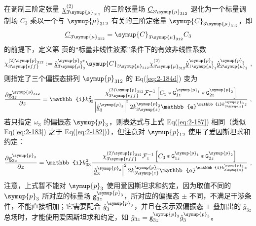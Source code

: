 在调制三阶定张量 $\underline{\chi}^{(2)}_{3{\symup{\mu}}_{312}}$ 的三阶张量场 $\underline{C}_{3{\symup{\mu}}_{312}}$ 退化为一个标量调制场 $C_{3}$ 乘以一个与 ${\symup{\mu}}_{312}$ 有关的三阶定张量 $\symup{C}_{3{\symup{\mu}}_{312}}$，即
\begin{equation} \label{eq:2-185}
	\abovedisplayskip=13pt
	\belowdisplayskip=13pt
	\underline{C}_{3{\symup{\mu}}_{312}} = \symup{C}_{3{\symup{\mu}}_{312}} C_{3}
\end{equation}
的前提下，定义第 \pageref{con:3} 页的“标量非线性波源”条件下的有效非线性系数
\begin{equation} \label{eq:2-186}
	\abovedisplayskip=13pt
	\belowdisplayskip=13pt
	\chi^{(2)\symup{p}_{312}}_{3\symup{eff}} := \hat{\underline{g}}^{\symup{p}_{3}*}_{3{{\symup{\mu}}_{3}}} \symup{C}_{3{\symup{\mu}}_{312}} \underline{\chi}^{(2)}_{3{\symup{\mu}}_{312}} \hat{\underline{g}}^{\symup{p}_{1}}_{1{\symup{\mu}}_1} \hat{\underline{g}}^{\symup{p}_{2}}_{2{\symup{\mu}}_2} ~,
\end{equation}
则指定了三个偏振态排列 $\symup{p}_{312}$ 的 Eq(\ref{eq:2-184d}) 变为
\begin{equation} \label{eq:2-187}
	\abovedisplayskip=13pt
	\belowdisplayskip=13pt
	\displaystyle{\frac{\partial {\mathtt{g}}^{\symup{p}_{312}}_{3z}}{\partial z}} = \mathbb{i} k^{2}_{03} \frac{ \chi^{(2)\symup{p}_{312}}_{3\symup{eff}} \mathcal F^{-1}_{z} \left[ C_{3} * {\mathtt{G}}^{\symup{p}_{1}}_{1z} * {\mathtt{G}}^{\symup{p}_{2}}_{2z} \right] }{ \left| \hat{\underline{g}}^{\symup{p}_{3}}_{3} \right|^2 2 k^{\symup{p}_{3}}_{3\symup{z}} \mathbb{e}^{\mathbb{i} k^{\symup{p}_{3}}_{3\symup{z}} z} } ~,
\end{equation}
若只指定 $\omega_3$ 的偏振态 $\symup{p}_{3}$，则表达式与上式 Eq(\ref{eq:2-187}) 相同（类似 Eq(\ref{eq:2-183}) 之于 Eq(\ref{eq:2-182})），但注意对 $\symup{p}_{12}$ 使用了爱因斯坦求和约定：
\begin{equation} \label{eq:2-188}
	\abovedisplayskip=13pt
	\belowdisplayskip=13pt
	\displaystyle{\frac{\partial {\mathtt{g}}^{\symup{p}_{3}}_{3z}}{\partial z}} = \mathbb{i} k^{2}_{03} \frac{ \chi^{(2)\symup{p}_{312}}_{3\symup{eff}} \mathcal F^{-1}_{z} \left[ C_{3} * {\mathtt{G}}^{\symup{p}_{1}}_{1z} * {\mathtt{G}}^{\symup{p}_{2}}_{2z} \right] }{ \left| \hat{\underline{g}}^{\symup{p}_{3}}_{3} \right|^2 2 k^{\symup{p}_{3}}_{3\symup{z}} \mathbb{e}^{\mathbb{i} k^{\symup{p}_{3}}_{3\symup{z}} z} } ~,
\end{equation}
注意，上式暂不能对 $\symup{p}_{3}$ 使用爱因斯坦求和约定，因为取值不同的 $\symup{p}_{3}$ 所对应的标量场 ${\mathtt{g}}^{\symup{p}_{3}}_{3z}$，所对应的偏振态 $\pm$ 不同，不满足干涉条件，不能直接相加；它需要配合 $\hat{g}^{\symup{p}_{3}}_{3}$，并且在表示双偏振态 $\pm$ 叠加出的 $\bar{g}_{3z}$ 总场时，才能使用爱因斯坦求和约定，如 $\bar{g}_{3z} = {\mathtt{g}}^{\symup{p}_{3}}_{3z} \hat{g}^{\symup{p}_{3}}_{3}$。

